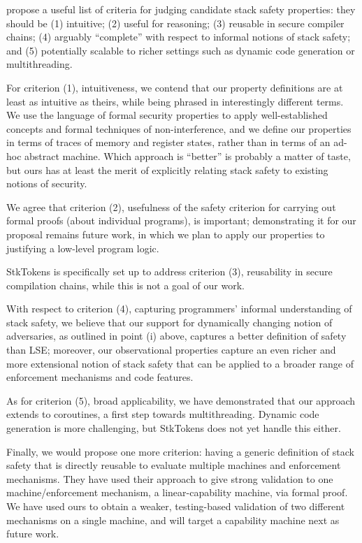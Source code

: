 \documentclass[acmsmall,review,anonymous]{acmart}\settopmatter{printfolios=true,printccs=false,printacmref=false}
\begin{document}
{\begin{enumerate}[label=(\roman*)]
\end{enumerate}

\citet{SkorstengaardSTKJFP} propose a useful list of criteria for judging
candidate stack safety properties: they should be (1) intuitive; (2)
useful for reasoning; (3) reusable in secure compiler chains; (4)
arguably ``complete'' with respect to informal notions of stack
safety; and (5) potentially scalable to richer settings such as
dynamic code generation or multithreading.

For criterion (1), intuitiveness, we contend that our property definitions are at least as
intuitive as theirs, while being phrased in interestingly different terms.
We use the language of formal security
properties to apply well-established concepts and formal techniques
of non-interference, and we define our properties in terms of
traces of memory and register states, rather than in terms of an
ad-hoc abstract machine.
Which approach is ``better'' is probably a matter of taste, but ours
has at least the merit of explicitly relating stack safety to existing
notions of security.

We agree that criterion (2), usefulness of the safety criterion
for carrying out formal proofs (about individual programs), is important;
demonstrating it for our proposal remains future work, in which we
plan to apply our properties to justifying a low-level program logic.

StkTokens
is specifically set up to address criterion (3), reusability in secure
compilation chains, while this is not a goal of
our work.

With respect to criterion (4), capturing programmers' informal
understanding of stack safety, we believe that our support
for dynamically changing notion of adversaries, as outlined in point (i) above,
captures a better definition of safety than LSE; moreover, our observational
properties capture an even richer and more extensional notion of stack safety
that can be applied to a broader range of enforcement mechanisms and code features.

As for criterion (5), broad applicability, we have demonstrated that our approach extends to
coroutines, a first step towards multithreading. Dynamic code generation is
more challenging, but StkTokens does not yet handle this either.

Finally, we would propose one more criterion: having a generic definition
of stack safety that is directly reusable to evaluate multiple machines and
enforcement mechanisms. They have used their approach to give strong validation
to one machine/enforcement mechanism, a linear-capability machine,
via formal proof. We have used ours to obtain a weaker, testing-based validation of
two different mechanisms on a single machine, and will target a capability machine
next as future work.

}
\end{document}
